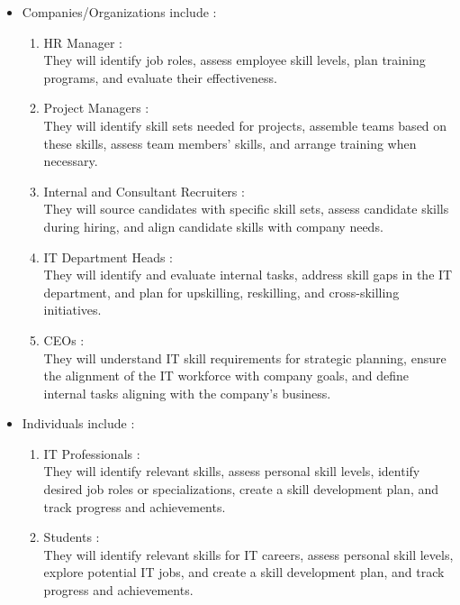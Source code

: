 \begin{itemize}
    \renewcommand\labelitemi{-}
    \item Companies/Organizations include : \\
          \begin{enumerate}
              \item HR Manager : \\
                    They will identify job roles, assess employee skill levels, plan training programs, and evaluate their effectiveness.
              \item Project Managers : \\
                    They will identify skill sets needed for projects, assemble teams based on these skills, assess team members' skills, and arrange training when necessary.
              \item Internal and Consultant Recruiters : \\
                    They will source candidates with specific skill sets, assess candidate skills during hiring, and align candidate skills with company needs.
              \item IT Department Heads : \\
                    They will identify and evaluate internal tasks, address skill gaps in the IT department, and plan for upskilling, reskilling, and cross-skilling initiatives.
              \item CEOs : \\
                    They will understand IT skill requirements for strategic planning, ensure the alignment of the IT workforce with company goals, and define internal tasks aligning with the company's business.
          \end{enumerate}
          \newpage
    \item Individuals include : \\
          \begin{enumerate}
              \item IT Professionals : \\
                    They will identify relevant skills, assess personal skill levels, identify desired job roles or specializations, create a skill development plan, and track progress and achievements.
              \item Students : \\
                    They will identify relevant skills for IT careers, assess personal skill levels, explore potential IT jobs, and create a skill development plan, and track progress and achievements.

\end{enumerate}
\end{itemize}
